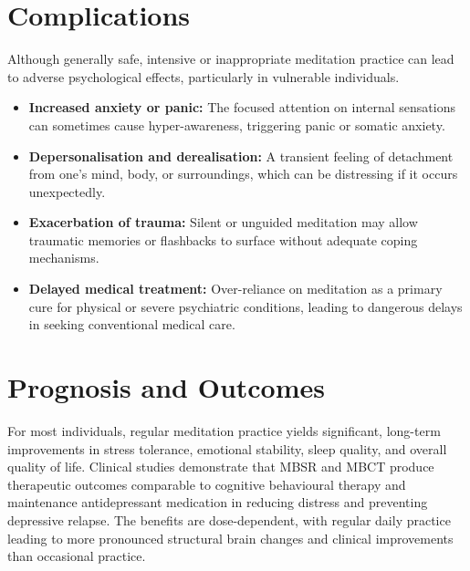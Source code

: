 \section*{Complications}
Although generally safe, intensive or inappropriate meditation practice can lead to adverse psychological effects, particularly in vulnerable individuals.
\begin{itemize}
    \item \textbf{Increased anxiety or panic:} The focused attention on internal sensations can sometimes cause hyper-awareness, triggering panic or somatic anxiety.
    \item \textbf{Depersonalisation and derealisation:} A transient feeling of detachment from one's mind, body, or surroundings, which can be distressing if it occurs unexpectedly.
    \item \textbf{Exacerbation of trauma:} Silent or unguided meditation may allow traumatic memories or flashbacks to surface without adequate coping mechanisms.
    \item \textbf{Delayed medical treatment:} Over-reliance on meditation as a primary cure for physical or severe psychiatric conditions, leading to dangerous delays in seeking conventional medical care.
\end{itemize}

\section*{Prognosis and Outcomes}
For most individuals, regular meditation practice yields significant, long-term improvements in stress tolerance, emotional stability, sleep quality, and overall quality of life. Clinical studies demonstrate that MBSR and MBCT produce therapeutic outcomes comparable to cognitive behavioural therapy and maintenance antidepressant medication in reducing distress and preventing depressive relapse. The benefits are dose-dependent, with regular daily practice leading to more pronounced structural brain changes and clinical improvements than occasional practice.

